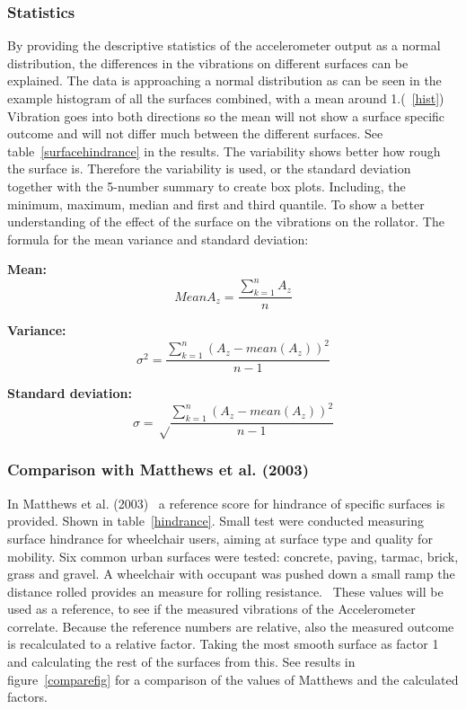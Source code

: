 \subsubsection{Statistics}
By providing the descriptive statistics of the accelerometer output as a normal distribution, the differences in the vibrations on different surfaces can be explained. The data is approaching a normal distribution as can be seen in the example histogram of all the surfaces combined, with a mean around 1.(~\ref{hist}) Vibration goes into both directions so the mean will not show a surface specific outcome and will not differ much between the different surfaces. See table~\ref{surfacehindrance} in the results. The variability shows better how rough the surface is. Therefore the variability is used, or the standard deviation together with the 5-number summary to create box plots. Including, the minimum, maximum, median and first and third quantile. To show a better understanding of the effect of the surface on the vibrations on the rollator. The formula for the mean variance and standard deviation:

\textbf{Mean:} 
\begin{equation}
Mean A_{z} = \frac{\sum_{k=1}^n A_{z}}{n}
\end{equation}

\textbf{Variance:}
\begin{equation}
\sigma^2 = \frac{\sum_{k=1}^n (A_{z}- mean(A_{z}))^2}{n-1}
\end{equation}

\textbf{Standard deviation:}
\begin{equation}
\sigma = \sqrt \frac{\sum_{k=1}^n (A_{z}- mean(A_{z}))^2}{n-1}
\end{equation}

\subsubsection{Comparison with Matthews et al. (2003)}
In Matthews et al. (2003)~\cite{Matthews2003} a reference score for hindrance of specific surfaces is provided. Shown in table~\ref{hindrance}.
Small test were conducted measuring surface hindrance for wheelchair users, aiming at surface type and quality for mobility. Six common urban surfaces were tested: concrete, paving, tarmac, brick, grass and gravel. A wheelchair with occupant was pushed down a small ramp the distance rolled provides an measure for rolling resistance.~\cite{Matthews2003}
These values will be used as a reference, to see if the measured vibrations of the Accelerometer correlate. Because the reference numbers are relative, also the measured outcome is recalculated to a relative factor. Taking the most smooth surface as factor 1 and calculating the rest of the surfaces from this. See results in figure~\ref{comparefig} for a comparison of the values of Matthews and the calculated factors. 


